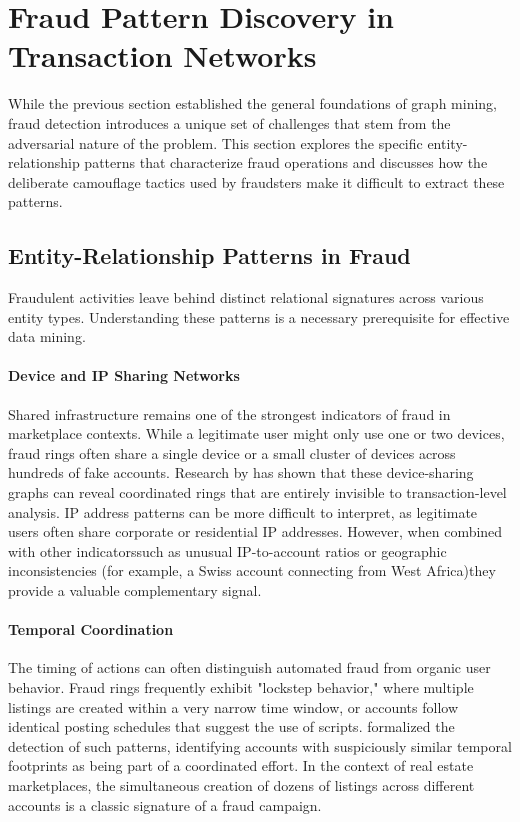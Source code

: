 \section{Fraud Pattern Discovery in Transaction Networks}
\label{sec:2_3}

While the previous section established the general foundations of graph mining, fraud detection introduces a unique set of challenges that stem from the adversarial nature of the problem. This section explores the specific entity-relationship patterns that characterize fraud operations and discusses how the deliberate camouflage tactics used by fraudsters make it difficult to extract these patterns.

\subsection{Entity-Relationship Patterns in Fraud}

Fraudulent activities leave behind distinct relational signatures across various entity types. Understanding these patterns is a necessary prerequisite for effective data mining.

\paragraph{Device and IP Sharing Networks}
Shared infrastructure remains one of the strongest indicators of fraud in marketplace contexts. While a legitimate user might only use one or two devices, fraud rings often share a single device or a small cluster of devices across hundreds of fake accounts. Research by \citeauthor{vanvlasselaer2015apate} \cite{vanvlasselaer2015apate} has shown that these device-sharing graphs can reveal coordinated rings that are entirely invisible to transaction-level analysis. IP address patterns can be more difficult to interpret, as legitimate users often share corporate or residential IP addresses. However, when combined with other indicatorssuch as unusual IP-to-account ratios or geographic inconsistencies (for example, a Swiss account connecting from West Africa)they provide a valuable complementary signal.

\paragraph{Temporal Coordination}
The timing of actions can often distinguish automated fraud from organic user behavior. Fraud rings frequently exhibit "lockstep behavior," where multiple listings are created within a very narrow time window, or accounts follow identical posting schedules that suggest the use of scripts. \citeauthor{cao2012aiding} \cite{cao2012aiding} formalized the detection of such patterns, identifying accounts with suspiciously similar temporal footprints as being part of a coordinated effort. In the context of real estate marketplaces, the simultaneous creation of dozens of listings across different accounts is a classic signature of a fraud campaign.


